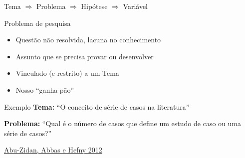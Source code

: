 \documentclass{beamer}
\begin{document}
\begin{frame}
  \begin{center}
    Tema $\Rightarrow$ Problema $\Rightarrow$ Hipótese $\Rightarrow$ Variável

    \bigskip
  \end{center}
\end{frame}

\begin{frame}{Problema de pesquisa}
  \begin{itemize}
    \footnotesize
  \item Questão não resolvida, lacuna no conhecimento
    \bigskip
  \item Assunto que se precisa provar ou desenvolver
    \bigskip
  \item Vinculado (e restrito) a um Tema
    \bigskip
  \item Nosso ``ganha-pão''
  \end{itemize}
\end{frame}

\begin{frame}
  \begin{exampleblock}{Exemplo}
    \small
    {\bf Tema:} ``O conceito de série de casos na literatura''

    \bigskip

    {\bf Problema:} ``Qual é o número de casos que define um estudo de caso ou uma série de casos?''
  \end{exampleblock}

  \vfill
  \scriptsize
  \hfill \href{http://dx.doi.org/10.4314/ahs.v12i4.25}{Abu-Zidan, Abbas e Hefny 2012}
\end{frame}
\end{document}
